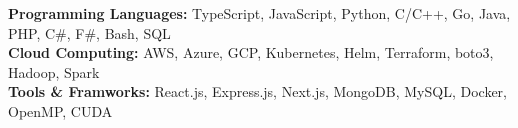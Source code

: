 \vspace{5pt}\item{
    \textbf{Programming Languages:} 
    TypeScript,
    JavaScript,
    Python,
    C/C++,
    Go,
    Java,
    PHP,
    C\#,
    F\#,
    Bash,
    SQL \\
    
    \textbf{Cloud Computing:} 
    AWS, 
    Azure, 
    GCP, 
    Kubernetes, 
    Helm, 
    Terraform, 
    boto3, 
    Hadoop, 
    Spark \\
    
    \textbf{Tools \& Framworks:} 
    React.js,
    Express.js,
    Next.js,
    MongoDB,
    MySQL,
    Docker,
    OpenMP,
    CUDA
}
